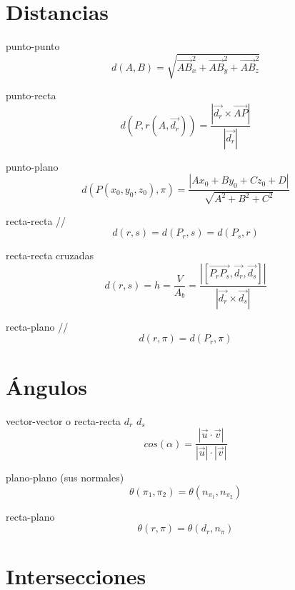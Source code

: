 \documentclass[12pt, letterpaper, twoside]{article}
\begin{document}
	\section{Distancias}
	
	punto-punto
	\begin{equation}
		d(A, B) = \sqrt{\vec{AB}_{x}^2 + \vec{AB}_{y}^2 + \vec{AB}_{z}^2}
	\end{equation}

	punto-recta
	\begin{equation}
		d(P, r(A, \vec{d_r})) = \frac{|\vec{d_r} \times \vec{AP}|}{|\vec{d_r}|}
	\end{equation}

	punto-plano
	\begin{equation}
		d(P(x_0, y_0, z_0), \pi) = \frac{|Ax_0 + By_0 + Cz_0 + D|}{\sqrt{A^2 + B^2 + C^2}}
	\end{equation}

	recta-recta //
	\begin{equation}
		d(r, s) = d(P_r, s) = d(P_s, r)
	\end{equation}

	recta-recta cruzadas
	\begin{equation}
		d(r, s) = h = \frac{V}{A_b} = \frac{|[\vec{P_r P_s}, \vec{d_r}, \vec{d_s}]|}{|\vec{d_r} \times \vec{d_s}|}
	\end{equation}

	recta-plano //
	\begin{equation}
		d(r, \pi) = d(P_r, \pi)
	\end{equation}

	
	\section{Ángulos}
	
	vector-vector o recta-recta $d_r$ $d_s$
	\begin{equation}
		cos(\alpha) = \frac{|\vec{u} \cdot \vec{v}|}{|\vec{u}| \cdot |\vec{v}|}
	\end{equation}

	plano-plano (sus normales)
	\begin{equation}
		\theta(\pi_1, \pi_2) = \theta(n_{\pi_1}, n_{\pi_2})
	\end{equation}

	recta-plano
	\begin{equation}
		\theta(r, \pi) = \theta(d_r, n_\pi)
	\end{equation}


	\section{Intersecciones}
	
\end{document}
